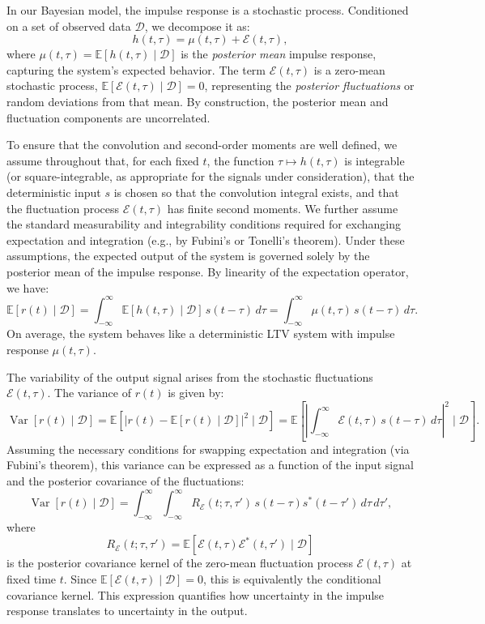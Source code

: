 \documentclass[preprint,1p,times,authoryear]{elsarticle}
\begin{document}
In our Bayesian model, the impulse response is a stochastic process. Conditioned on a set of observed data $\mathcal{D}$, we decompose it as:
\begin{equation}
h(t, \tau) = \mu(t, \tau) + \mathcal{E}(t, \tau),
\end{equation}
where $\mu(t, \tau) = \mathbb{E}[h(t, \tau) \mid \mathcal{D}]$ is the \emph{posterior mean} impulse response, capturing the system's expected behavior. The term $\mathcal{E}(t, \tau)$ is a zero-mean stochastic process, $\mathbb{E}[\mathcal{E}(t, \tau) \mid \mathcal{D}] = 0$, representing the \emph{posterior fluctuations} or random deviations from that mean. By construction, the posterior mean and fluctuation components are uncorrelated.

To ensure that the convolution and second-order moments are well defined, we assume throughout that, for each fixed $t$, the function $\tau \mapsto h(t,\tau)$ is integrable (or square-integrable, as appropriate for the signals under consideration), that the deterministic input $s$ is chosen so that the convolution integral exists, and that the fluctuation process $\mathcal{E}(t,\tau)$ has finite second moments. We further assume the standard measurability and integrability conditions required for exchanging expectation and integration (e.g., by Fubini's or Tonelli's theorem). Under these assumptions, the expected output of the system is governed solely by the posterior mean of the impulse response. By linearity of the expectation operator, we have:
\begin{equation}
\mathbb{E}\left[ r(t) \mid \mathcal{D} \right] = \int_{-\infty}^{\infty} \mathbb{E}[h(t, \tau) \mid \mathcal{D}] \, s(t - \tau) \, d\tau = \int_{-\infty}^{\infty} \mu(t, \tau) \, s(t - \tau) \, d\tau.
\end{equation}
On average, the system behaves like a deterministic LTV system with impulse response $\mu(t, \tau)$.

The variability of the output signal arises from the stochastic fluctuations $\mathcal{E}(t, \tau)$. The variance of $r(t)$ is given by:
\[
\operatorname{Var}[r(t) \mid \mathcal{D}] = \mathbb{E}\left[ \left| r(t) - \mathbb{E}[r(t) \mid \mathcal{D}] \right|^2 \mid \mathcal{D} \right] = \mathbb{E}\left[\left|\int_{-\infty}^{\infty} \mathcal{E}(t, \tau) \, s(t-\tau) \, d\tau\right|^2 \mid \mathcal{D}\right].
\]
Assuming the necessary conditions for swapping expectation and integration (via Fubini's theorem), this variance can be expressed as a function of the input signal and the posterior covariance of the fluctuations:
\[
\operatorname{Var}[r(t) \mid \mathcal{D}] = \int_{-\infty}^{\infty} \int_{-\infty}^{\infty} R_{\mathcal{E}}(t; \tau, \tau') \, s(t-\tau) s^*(t-\tau') \, d\tau \, d\tau',
\]
where
\[
R_{\mathcal{E}}(t; \tau, \tau') = \mathbb{E}\!\left[\mathcal{E}(t,\tau)\mathcal{E}^*(t,\tau') \mid \mathcal{D}\right]
\]
is the posterior covariance kernel of the zero-mean fluctuation process $\mathcal{E}(t,\tau)$ at fixed time $t$. Since $\mathbb{E}[\mathcal{E}(t,\tau)\mid\mathcal{D}] = 0$, this is equivalently the conditional covariance kernel. This expression quantifies how uncertainty in the impulse response translates to uncertainty in the output.
\end{document}
